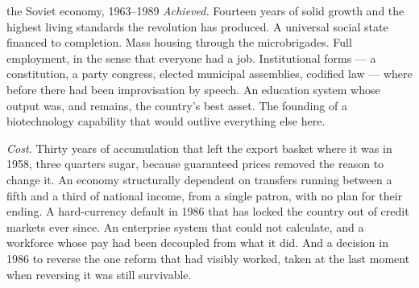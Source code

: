 \begin{ledger}{the Soviet economy, 1963--1989}
\emph{Achieved.} Fourteen years of solid growth and the highest living
standards the revolution has produced. A universal social state financed to
completion. Mass housing through the microbrigades. Full employment, in the
sense that everyone had a job. Institutional forms --- a constitution, a party
congress, elected municipal assemblies, codified law --- where before there had
been improvisation by speech. An education system whose output was, and remains,
the country's best asset. The founding of a biotechnology capability that would
outlive everything else here.

\emph{Cost.} Thirty years of accumulation that left the export basket where it
was in 1958, three quarters sugar, because guaranteed prices removed the reason
to change it. An economy structurally dependent on transfers running between a
fifth and a third of national income, from a single patron, with no plan for
their ending. A hard-currency default in 1986 that has locked the country out
of credit markets ever since. An enterprise system that could not calculate,
and a workforce whose pay had been decoupled from what it did. And a decision
in 1986 to reverse the one reform that had visibly worked, taken at the last
moment when reversing it was still survivable.
\end{ledger}
